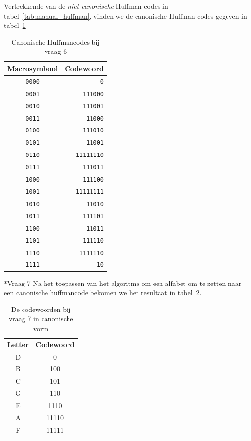 \documentclass[]{article}
\begin{document}
\begin{section}
\begin{subsection}
    	Vertrekkende van de \emph{niet-canonische} Huffman codes in 
    	tabel~\ref{tab:manual_huffman}, vinden we de canonische
    	Huffman codes gegeven in tabel~\ref{tab:canonical_huffman}
    	
    	\begin{table}
            \centering
            \begin{tabular}{c|r}
                \textbf{Macrosymbool} &
                \textbf{Codewoord} \\
                \hline
                \texttt{0000} & \texttt{0} \\
				\texttt{0001} & \texttt{111000} \\
				\texttt{0010} & \texttt{111001} \\
				\texttt{0011} & \texttt{11000} \\
				\texttt{0100} & \texttt{111010} \\
				\texttt{0101} & \texttt{11001} \\
				\texttt{0110} & \texttt{11111110} \\
				\texttt{0111} & \texttt{111011} \\
				\texttt{1000} & \texttt{111100} \\
				\texttt{1001} & \texttt{11111111} \\
				\texttt{1010} & \texttt{11010} \\
				\texttt{1011} & \texttt{111101} \\
				\texttt{1100} & \texttt{11011} \\
				\texttt{1101} & \texttt{111110} \\
				\texttt{1110} & \texttt{1111110} \\
				\texttt{1111} & \texttt{10} \\
            \end{tabular}
            \caption{Canonische Huffmancodes bij vraag 6}
            \label{tab:canonical_huffman}
        \end{table}
    	
    \end{subsection}

    \begin{subsection}*{Vraag 7}
		Na het toepassen van het algoritme om een alfabet om te zetten naar een
		canonische huffmancode bekomen we het resultaat in
		tabel~\ref{tab:canonical_codes}.
        \begin{table}
    		\centering	
    		\begin{tabular}{c|c}
    		\textbf{Letter} &
            \textbf{Codewoord} \\
    		D & 0 \\
			B & 100 \\
			C & 101 \\
			G & 110 \\
			E & 1110 \\
			A & 11110 \\
			F & 11111 \\
    		\end{tabular}
    		\caption{De codewoorden bij vraag 7 in canonische vorm}
    		\label{tab:canonical_codes}
    	\end{table}


\end{subsection}
\end{section}
\end{document}
